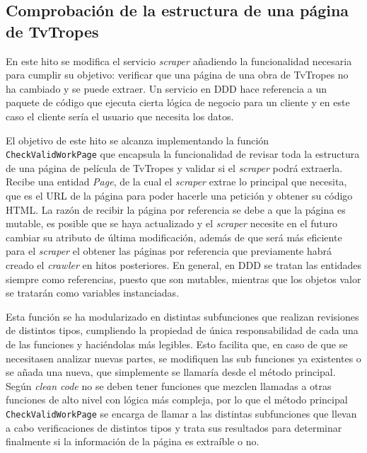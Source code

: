 \subsection{Comprobación de la estructura de una página de TvTropes}
En este hito se modifica el servicio \textit{scraper} añadiendo la funcionalidad
necesaria para cumplir su objetivo: verificar que una página de una obra de
TvTropes no ha cambiado y se puede extraer. Un servicio en DDD hace referencia a
un paquete de código que ejecuta cierta lógica de negocio para un cliente y en
este caso el cliente sería el usuario que necesita los datos. 

El objetivo de este hito se alcanza implementando la función \texttt{CheckValidWorkPage} que 
encapsula la funcionalidad de revisar toda la estructura de una página de
película de TvTropes y validar si el \textit{scraper} podrá extraerla. Recibe
una entidad \textit{Page}, de la cual el \textit{scraper} extrae lo principal
que necesita, que es el URL de la página para poder hacerle una petición y
obtener su código HTML. La razón de recibir la página por referencia se debe a
que la página es mutable, es posible que se haya actualizado y el
\textit{scraper} necesite en el futuro cambiar su atributo de última
modificación, además de que será más eficiente para el \textit{scraper} el
obtener las páginas por referencia que previamente habrá creado el
\textit{crawler} en hitos posteriores. En general, en DDD se tratan las
entidades siempre como referencias, puesto que son mutables, mientras que los
objetos valor se tratarán como variables instanciadas.

Esta función se ha modularizado en distintas subfunciones que realizan
revisiones de distintos tipos, cumpliendo la propiedad de única responsabilidad
de cada una de las funciones y haciéndolas más legibles. Esto facilita que, en
caso de que se necesitasen analizar nuevas partes, se modifiquen las sub
funciones ya existentes o se añada una nueva, que simplemente se llamaría desde
el método principal. Según \textit{clean code} no se deben tener funciones que
mezclen llamadas a otras funciones de alto nivel con lógica más compleja, por lo
que el método principal \texttt{CheckValidWorkPage} se encarga de llamar a las
distintas subfunciones que llevan a cabo verificaciones de distintos tipos y
trata sus resultados para determinar finalmente si la información de la página
es extraíble o no.

